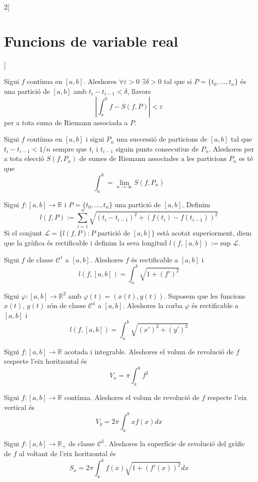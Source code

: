 \documentclass[../../../main.tex]{subfiles}
\begin{document}
\begin{multicols}{2}[\section{Funcions de variable real}]
\begin{theorem}
Sigui $f$ contínua en $[a,b]$. Aleshores $\forall\varepsilon>0$ $\exists\delta>0$ tal que si $P=\{t_0,\ldots,t_n\}$ és una partició de $[a,b]$ amb $t_i-t_{i-1}<\delta$, llavors $$\left|\int_a^bf-S(f,P)\right|<\varepsilon$$ per a tota suma de Riemann associada a $P$.
\end{theorem}
\begin{corollary}
Sigui $f$ contínua en $[a,b]$ i sigui $P_n$ una successió de particions de $[a,b]$ tal que $t_i-t_{i-1}<1/n$ sempre que $t_i$ i $t_{i-1}$ siguin punts consecutius de $P_n$. Aleshores per a tota elecció $S(f,P_n)$ de sumes de Riemann associades a les particions $P_n$ es té que $$\int_a^b=\lim_{n\to\infty}S(f,P_n)$$
\end{corollary}
\begin{definition}
Sigui $f:[a,b]\rightarrow\mathbb{R}$ i $P=\{t_0,\ldots,t_n\}$ una partició de $[a,b]$. Definim $$l(f,P):=\sum_{i=1}^n\sqrt{(t_i-t_{i-1})^2+(f(t_i)-f(t_{i-1}))^2}$$Si el conjunt $\mathcal{L}=\{l(f,P):P \text{ partició de }[a,b]\}$ està acotat superiorment, diem que la gràfica és rectificable i definim la seva longitud $l(f,[a,b]):=\text{sup }\mathcal{L}$.
\end{definition}
\begin{prop}
Sigui $f$ de classe $\mathcal{C}^1$ a $[a,b]$. Aleshores $f$ és rectificable a $[a,b]$ i $$l(f,[a,b])=\int_a^b\sqrt{1+(f')^2}$$
\end{prop}
\begin{prop}
Sigui $\varphi:[a,b]\rightarrow\mathbb{R}^2$ amb $\varphi(t)=(x(t),y(t))$. Suposem que les funcions $x(t)$, $y(t)$ són de classe $\mathcal{C}^1$ a $[a,b]$. Aleshores la corba $\varphi$ és rectificable a $[a,b]$ i $$l(f,[a,b])=\int_a^b\sqrt{(x')^2+(y')^2}$$
\end{prop}
\begin{prop}
Sigui $f:[a,b]\rightarrow\mathbb{R}$ acotada i integrable. Aleshores el volum de revolució de $f$ respecte l'eix horitzontal és $$V_x=\pi\int_a^bf^2$$
\end{prop}
\begin{prop}
Sigui $f:[a,b]\rightarrow\mathbb{R}$ contínua. Aleshores el volum de revolució de $f$ respecte l'eix vertical és $$V_y=2\pi\int_a^bxf(x)dx$$
\end{prop}
\begin{prop}
Sigui $f:[a,b]\rightarrow\mathbb{R_+}$ de classe $\mathcal{C}^1$. Aleshores la superfície de revolució del gràfic de $f$ al voltant de l'eix horitzontal és $$S_x=2\pi\int_a^bf(x)\sqrt{1+(f'(x))^2}dx$$

\end{prop}
\end{multicols}
\end{document}
